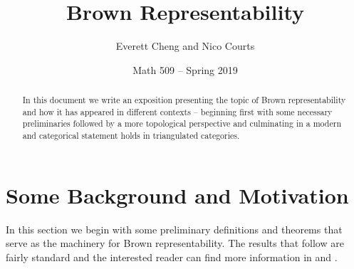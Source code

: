 \documentclass[12pt]{article}
\begin{document}
\title{Brown Representability\vspace{-1ex}}
\author{Everett Cheng and Nico Courts}
\date{Math 509 -- Spring 2019}
\maketitle

\renewcommand{\abstractname}{Introduction}
\begin{abstract}
  In this document we write an exposition presenting the topic of Brown representability and how it has appeared in different contexts -- beginning first with some necessary preliminaries followed by a more topological perspective and culminating in a modern and categorical statement holds in triangulated categories.
\end{abstract}

\section{Some Background and Motivation}
In this section we begin with some preliminary definitions and theorems that serve as the machinery for Brown representability. The results that follow are fairly standard and the interested reader can find more information in \cite{neeman-book} and \cite{riehl}.
\end{document}
